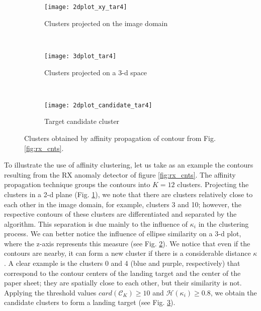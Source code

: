 \begin{figure}[h]
    \centering
    \begin{subfigure}[b]{0.45\textwidth}
        \texttt{[image: 2dplot\_xy\_tar4]}
        \caption{Clusters projected on the image domain}
        \label{fig:2dplot}
    \end{subfigure}
    ~ %
    \begin{subfigure}[b]{0.45\textwidth}
        \texttt{[image: 3dplot\_tar4]}
        \caption{Clusters projected on a 3-d space}
        \label{fig:3dplot}
    \end{subfigure}
    ~ %
    \begin{subfigure}[b]{0.45\textwidth}
        \texttt{[image: 2dplot\_candidate\_tar4]}
        \caption{Target candidate cluster}
        \label{fig:candidate}
    \end{subfigure}
   \caption{Clusters obtained by affinity propagation of contour from Fig. \ref{fig:rx_cnts}.}\label{fig:grouping_process}
\end{figure}

To illustrate the use of affinity clustering, let us take as an example the contours resulting from the RX anomaly detector of figure \ref{fig:rx_cnts}. The affinity propagation technique groups the contours into $K=12$ clusters. Projecting the clusters in a 2-d plane (Fig. \ref{fig:2dplot}), we note that there are clusters relatively close to each other in the image domain, for example, clusters 3 and 10; however, the respective contours of these clusters are differentiated and separated by the algorithm. This separation is due mainly to the influence of $\kappa_{i}$ in the clustering process. We can better notice the influence of ellipse similarity on a 3-d plot, where the z-axis represents this measure (see Fig. \ref{fig:3dplot}). We notice that even if the contours are nearby, it can form a new cluster if there is a considerable distance $\kappa$. A clear example is the clusters 0 and 4 (blue and purple, respectively) that correspond to the contour centers of the landing target and the center of the paper sheet; they are spatially close to each other, but their similarity is not. Applying the threshold values $card(\mathcal{C}_{K})\geq 10$ and $\mathcal{H}(\kappa_{i})\geq 0.8$, we obtain the candidate clusters to form a landing target (see Fig. \ref{fig:candidate}). 

